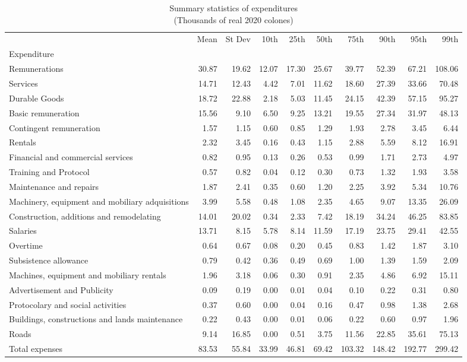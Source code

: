 \begin{table}[h]
\centering
\caption{Summary statistics of expenditures\\(Thousands of real 2020 colones)}
\begin{tabular}{lrrrrrrrrr}
\toprule
 & Mean & St Dev & 10th & 25th & 50th & 75th & 90th & 95th & 99th \\
Expenditure &  &  &  &  &  &  &  &  &  \\
\midrule
Remunerations & 30.87 & 19.62 & 12.07 & 17.30 & 25.67 & 39.77 & 52.39 & 67.21 & 108.06 \\
Services & 14.71 & 12.43 & 4.42 & 7.01 & 11.62 & 18.60 & 27.39 & 33.66 & 70.48 \\
Durable Goods & 18.72 & 22.88 & 2.18 & 5.03 & 11.45 & 24.15 & 42.39 & 57.15 & 95.27 \\
Basic remuneration & 15.56 & 9.10 & 6.50 & 9.25 & 13.21 & 19.55 & 27.34 & 31.97 & 48.13 \\
Contingent remuneration & 1.57 & 1.15 & 0.60 & 0.85 & 1.29 & 1.93 & 2.78 & 3.45 & 6.44 \\
Rentals & 2.32 & 3.45 & 0.16 & 0.43 & 1.15 & 2.88 & 5.59 & 8.12 & 16.91 \\
Financial and commercial services & 0.82 & 0.95 & 0.13 & 0.26 & 0.53 & 0.99 & 1.71 & 2.73 & 4.97 \\
Training and Protocol & 0.57 & 0.82 & 0.04 & 0.12 & 0.30 & 0.73 & 1.32 & 1.93 & 3.58 \\
Maintenance and repairs & 1.87 & 2.41 & 0.35 & 0.60 & 1.20 & 2.25 & 3.92 & 5.34 & 10.76 \\
Machinery, equipment and mobiliary adquisitions & 3.99 & 5.58 & 0.48 & 1.08 & 2.35 & 4.65 & 9.07 & 13.35 & 26.09 \\
Construction, additions and remodelating & 14.01 & 20.02 & 0.34 & 2.33 & 7.42 & 18.19 & 34.24 & 46.25 & 83.85 \\
Salaries & 13.71 & 8.15 & 5.78 & 8.14 & 11.59 & 17.19 & 23.75 & 29.41 & 42.55 \\
Overtime & 0.64 & 0.67 & 0.08 & 0.20 & 0.45 & 0.83 & 1.42 & 1.87 & 3.10 \\
Subsistence allowance & 0.79 & 0.42 & 0.36 & 0.49 & 0.69 & 1.00 & 1.39 & 1.59 & 2.09 \\
Machines, equipment and mobiliary rentals & 1.96 & 3.18 & 0.06 & 0.30 & 0.91 & 2.35 & 4.86 & 6.92 & 15.11 \\
Advertisement and Publicity & 0.09 & 0.19 & 0.00 & 0.01 & 0.04 & 0.10 & 0.22 & 0.31 & 0.80 \\
Protocolary and social activities & 0.37 & 0.60 & 0.00 & 0.04 & 0.16 & 0.47 & 0.98 & 1.38 & 2.68 \\
Buildings, constructions and lands maintenance & 0.22 & 0.43 & 0.00 & 0.01 & 0.06 & 0.22 & 0.60 & 0.97 & 1.96 \\
Roads & 9.14 & 16.85 & 0.00 & 0.51 & 3.75 & 11.56 & 22.85 & 35.61 & 75.13 \\
Total expenses & 83.53 & 55.84 & 33.99 & 46.81 & 69.42 & 103.32 & 148.42 & 192.77 & 299.42 \\
\bottomrule
\end{tabular}
\end{table}
